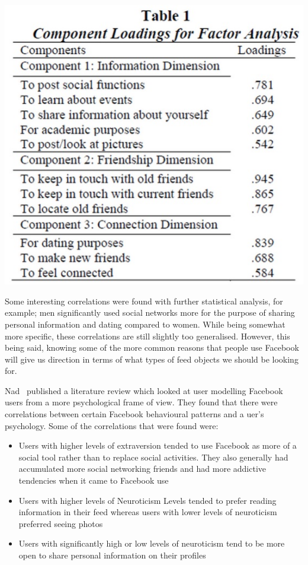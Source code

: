 \begin{center}
  \includegraphics[scale=0.6]{images/factoranalysis.jpg}
\end{center}

Some interesting correlations were found with further statistical analysis, for example; men significantly used social networks more for the purpose of sharing personal information and dating compared to women. While being somewhat more specific, these correlations are still slightly too generalised. However, this being said, knowing some of the more common reasons that people use Facebook will give us direction in terms of what types of feed objects we should be looking for.

Nad~\cite{nadkarni2012people} published a literature review which looked at user modelling Facebook users from a more psychological frame of view. They found that there were correlations between certain Facebook behavioural patterns and a uer's psychology. Some of the correlations that were found were:

\begin{itemize}
 \item Users with higher levels of extraversion tended to use Facebook as more of a social tool rather than to replace social activities. They also generally had accumulated more social networking friends  and had more addictive tendencies when it came to Facebook use 
 \item Users with higher levels of Neuroticism Levels tended to prefer reading information in their feed whereas users with lower levels of neuroticism preferred seeing photos
 \item Users with significantly high or low levels of neuroticism tend to be more open to share personal information on their profiles
\end{itemize}

